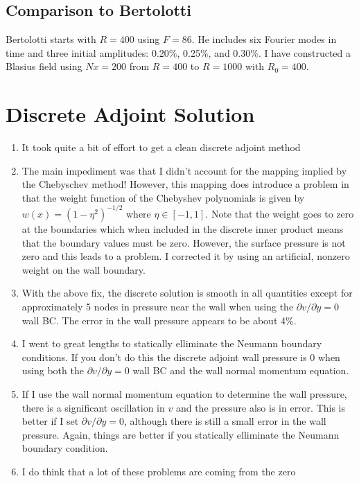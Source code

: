 \documentclass[12pt]{article}
\begin{document}
\subsection{Comparison to Bertolotti}

Bertolotti starts with $R=400$ using $F=86$.  He includes six Fourier modes in
time and three initial amplitudes: 0.20\%, 0.25\%, and 0.30\%.  I have
constructed a Blasius field using $Nx=200$ from $R=400$ to $R=1000$ with
$R_0=400$.

\section{Discrete Adjoint Solution}

\begin{enumerate}
\item It took quite a bit of effort to get a clean discrete adjoint method
\item The main impediment was that I didn't account for the mapping implied by
the Chebyschev method!  However, this mapping does introduce a problem in that
the weight function of the Chebyshev polynomials is given by $w(x) =
(1-\eta^2)^{-1/2}$ where $\eta \in [-1,1]$.  Note that the weight goes to zero
at the boundaries which when included in the discrete inner product means that
the boundary values must be zero.  However, the surface pressure is not zero
and this leads to a problem.  I corrected it by using an artificial, nonzero
weight on the wall boundary.
\item With the above fix, the discrete solution is smooth in all quantities
except for approximately 5 nodes in pressure near the wall when using the
$\partial v/\partial y=0$ wall BC.  The error in the wall pressure appears to
be about 4\%.
\item I went to great lengths to statically elliminate the Neumann boundary
conditions.  If you don't do this the discrete adjoint wall pressure is 0 when
using both the $\partial v/\partial y=0$ wall BC and the wall normal momentum
equation.
\item If I use the wall normal momentum equation to determine the wall
pressure, there is a significant oscillation in $v$ and the pressure also is
in error.  This is better if I set $\partial v/\partial y=0$, although there
is still a small error in the wall pressure.  Again, things are better if you
statically elliminate the Neumann boundary condition.
\item I do think that a lot of these problems are coming from the zero

\end{enumerate}
\end{document}
